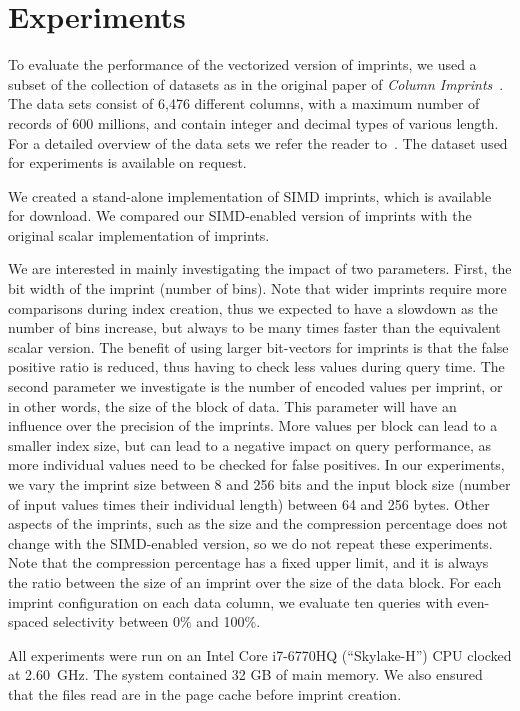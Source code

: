 \documentclass[sigconf]{acmart}
\begin{document}
\section{Experiments}\label{sec:experiments}

To evaluate the performance of the vectorized version of imprints, we used a subset of the collection of datasets as in the original paper of
{\em Column Imprints}~\cite{DBLP:conf/sigmod/SidirourgosK13}. The data sets consist of 6,476 different columns, with a maximum number of
records of 600 millions, and contain integer and decimal types of various length. For a detailed overview of the data sets we refer
the reader to~\cite{DBLP:conf/sigmod/SidirourgosK13}. The dataset used for experiments is available on request.

We created a stand-alone implementation of SIMD imprints, which is available for download. We compared our SIMD-enabled version of imprints with the original scalar implementation of imprints.

We are interested in mainly investigating the impact of two parameters. First, the bit width of the imprint (number of bins). Note that wider
imprints require more comparisons during index creation, thus we expected to have a slowdown as the number of bins increase, but always to be many 
times faster than the equivalent scalar version. The benefit of using larger bit-vectors for imprints is that the false positive ratio is reduced, 
thus having to check less values during query time. The second parameter we investigate is the number of encoded values per imprint, or in other 
words, the size of the block of data. This parameter will have an influence over the precision of the imprints. More values per block can lead to a 
smaller index size, but can lead to a negative impact on query performance, as more individual values need to be checked for false positives. In our
experiments, we vary the imprint size between 8 and 256 bits and the input block size (number of input values times their individual length) between
64 and 256 bytes. Other aspects of the imprints, such as the size and the compression percentage does not change with the SIMD-enabled version,
so we do not repeat these experiments. Note that the compression percentage has a fixed upper limit, and it is always the ratio between the size of
an imprint over the size of the data block. For each imprint configuration on each data column, we evaluate ten queries with even-spaced
selectivity between 0\% and 100\%.

All experiments were run on an Intel Core i7-6770HQ (``Skylake-H'') CPU clocked at 2.60~GHz. The system contained 32 GB of main 
memory. We also ensured that the files read are in the page cache before imprint creation.
\end{document}
